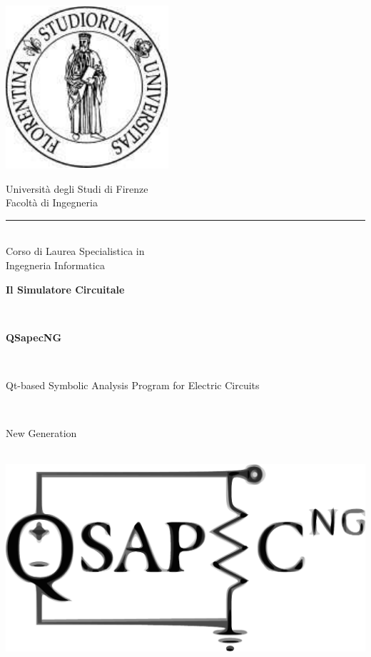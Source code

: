 \thispagestyle{empty}

\begin{center}
  \begin{center}
    \includegraphics[scale=0.75]{immagini/salomone.pdf}
  \end{center}
  Università degli Studi di Firenze\\
  Facoltà di Ingegneria\\
  \rule{9cm}{0.5mm}\\[0.3cm]
  Corso di Laurea Specialistica in\\ Ingegneria Informatica\\
  \vspace{3cm}
  {
    \begin{Large}\textbf{Il Simulatore Circuitale}\end{Large}\\\vspace{10pt}
    \begin{huge}\textbf{QSapecNG}\end{huge}\\\vspace{10pt}
    \begin{large}Qt-based Symbolic Analysis Program for Electric Circuits\end{large}\\\vspace{10pt}
    \begin{large}New Generation\end{large}
  }\\
  \vspace{2.5cm} { \includegraphics[scale=0.45]{immagini/qsapecng.pdf} }\\

\end{center}
